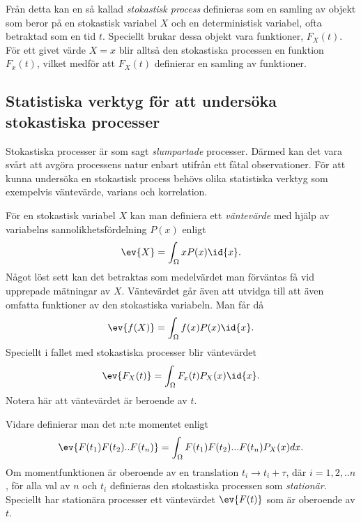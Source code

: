 Från detta kan en så kallad \emph{stokastisk process} definieras som en
samling av objekt som beror på en stokastisk variabel $X$ och en
deterministisk variabel, ofta betraktad som en tid\footnotemark{}
$t$. Speciellt brukar dessa objekt vara 
funktioner, $F_X(t)$. För ett givet värde $X=x$ blir alltså den
stokastiska processen en funktion $F_x(t)$, vilket medför att $F_X(t)$
definierar en samling av funktioner. 

\subsection{Statistiska verktyg för att undersöka stokastiska processer}
Stokastiska processer är som sagt \emph{slumpartade} processer. Därmed kan
det vara svårt att avgöra processens natur enbart utifrån ett fåtal
observationer. För att kunna undersöka en stokastisk process
behövs olika statistiska verktyg som exempelvis väntevärde, varians
och korrelation. 

För en stokastisk variabel $X$ kan man definiera ett \emph{väntevärde} med hjälp av variabelns sannolikhetsfördelning $P(x)$ enligt
\begin{equation}\label{eq:EV}
    \ev{X} = \int_{\Omega} x P(x) \id{x}.
\end{equation}
Något löst sett kan det betraktas som medelvärdet man förväntas få vid
upprepade mätningar av $X$. 
Väntevärdet går även att utvidga till att även omfatta funktioner av
den stokastiska variabeln. Man får då 
\begin{equation}\label{eq:EV_f}
    \ev{f(X)} = \int_{\Omega} f(x) P(x) \id{x}.
\end{equation}
Speciellt i fallet med stokastiska processer blir väntevärdet 
\begin{equation}\label{eq:EV_process}
    \ev{F_X(t)} = \int_{\Omega} F_x(t)P_X(x) \id{x}.
\end{equation}
Notera här att väntevärdet är beroende av $t$. 

Vidare definierar man det n:te momentet enligt 
\begin{equation}
    \ev{F(t_1)F(t_2)..F(t_n)} = \int_{\Omega} F(t_1)F(t_2)...F(t_n)P_X(x)dx.
\end{equation}
Om momentfunktionen är oberoende av en translation $t_i\to t_i+\tau$, där $i=1,2,..n$, för alla val av $n$ och $t_i$ definieras den stokastiska processen som \emph{stationär}. Speciellt har stationära processer ett  väntevärdet $\ev{F(t)}$ som är oberoende av $t$. 

